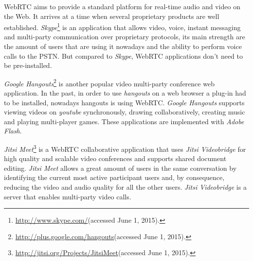 \ac{WebRTC} aims to provide a standard platform for real-time audio and video on the Web. It arrives at a time when several proprietary products are well established.
\emph{Skype}\footnote{\url{http://www.skype.com/}(accessed June 1, 2015).} is an application that allows video, voice, instant messaging and multi-party communication over proprietary protocols, its main strength are the amount of users that are using it nowadays and the ability to perform voice calls to the \ac{PSTN}. But compared to \emph{Skype}, \ac{WebRTC} applications don't need to be pre-installed.

\emph{Google Hangouts}\footnote{\url{http://plus.google.com/hangouts}(accessed June 1, 2015).} is another popular video multi-party conference web application. 
In the past, in order to use \emph{hangouts} on a web browser a plug-in had to be installed, nowadays hangouts is using \ac{WebRTC}. \emph{Google Hangouts} supports viewing videos on \emph{youtube} synchronously, drawing collaboratively, creating music and playing multi-player games. These applications are implemented with \emph{Adobe Flash}.  

\emph{Jitsi Meet}\footnote{\url{http://jitsi.org/Projects/JitsiMeet}(accessed June 1, 2015).} is a \ac{WebRTC} collaborative application that uses \emph{Jitsi Videobridge} for high quality and scalable video conferences and supports shared document editing. \emph{Jitsi Meet} allows a great amount of users in the same conversation by identifying the current most active participant users and, by consequence, reducing the video and audio quality for all the other users. \emph{Jitsi Videobridge} is a server that enables multi-party video calls. 



